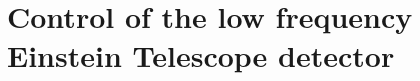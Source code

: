 \chapter{\label{c:et-lf-control}Control of the low frequency Einstein Telescope detector}

\newcommand{\AS}{AS}
\newcommand{\POP}{POP}
\newcommand{\REFL}{REFL}

\newcommand{\ASDC}{$\text{\AS}_{\text{DC}}$}
\newcommand{\ASFIRSTI}{$\text{\AS}_{\num{11}}^{\text{I}}$}
\newcommand{\ASFIRSTQ}{$\text{\AS}_{\num{11}}^{\text{Q}}$}
\newcommand{\ASSECONDI}{$\text{\AS}_{\num{57}}^{\text{I}}$}
\newcommand{\ASSECONDQ}{$\text{\AS}_{\num{57}}^{\text{Q}}$}
\newcommand{\ASSUMI}{$\text{\AS}_{\num{68}}^{\text{I}}$}
\newcommand{\ASSUMQ}{$\text{\AS}_{\num{68}}^{\text{Q}}$}
\newcommand{\ASDIFFI}{$\text{\AS}_{\num{45}}^{\text{I}}$}
\newcommand{\ASDIFFQ}{$\text{\AS}_{\num{45}}^{\text{Q}}$}
\newcommand{\POPDC}{$\text{\POP}_{\text{DC}}$}
\newcommand{\POPFIRSTI}{$\text{\POP}_{\num{11}}^{\text{I}}$}
\newcommand{\POPFIRSTQ}{$\text{\POP}_{\num{11}}^{\text{Q}}$}
\newcommand{\POPSECONDI}{$\text{\POP}_{\num{57}}^{\text{I}}$}
\newcommand{\POPSECONDQ}{$\text{\POP}_{\num{57}}^{\text{Q}}$}
\newcommand{\POPSUMI}{$\text{\POP}_{\num{68}}^{\text{I}}$}
\newcommand{\POPSUMQ}{$\text{\POP}_{\num{68}}^{\text{Q}}$}
\newcommand{\POPDIFFI}{$\text{\POP}_{\num{45}}^{\text{I}}$}
\newcommand{\POPDIFFQ}{$\text{\POP}_{\num{45}}^{\text{Q}}$}
\newcommand{\REFLDC}{$\text{\REFL}_{\text{DC}}$}
\newcommand{\REFLFIRSTI}{$\text{\REFL}_{\num{11}}^{\text{I}}$}
\newcommand{\REFLFIRSTQ}{$\text{\REFL}_{\num{11}}^{\text{Q}}$}
\newcommand{\REFLSECONDI}{$\text{\REFL}_{\num{57}}^{\text{I}}$}
\newcommand{\REFLSECONDQ}{$\text{\REFL}_{\num{57}}^{\text{Q}}$}
\newcommand{\REFLSUMI}{$\text{\REFL}_{\num{68}}^{\text{I}}$}
\newcommand{\REFLSUMQ}{$\text{\REFL}_{\num{68}}^{\text{Q}}$}
\newcommand{\REFLDIFFI}{$\text{\REFL}_{\num{45}}^{\text{I}}$}
\newcommand{\REFLDIFFQ}{$\text{\REFL}_{\num{45}}^{\text{Q}}$}

\newcommand{\ASFIRST}{$\text{\AS}_{\num{11}}$}
\newcommand{\ASSECOND}{$\text{\AS}_{\num{57}}$}
\newcommand{\ASSUM}{$\text{\AS}_{\num{68}}$}
\newcommand{\ASDIFF}{$\text{\AS}_{\num{45}}$}
\newcommand{\POPFIRST}{$\text{\POP}_{\num{11}}$}
\newcommand{\POPSECOND}{$\text{\POP}_{\num{57}}$}
\newcommand{\POPSUM}{$\text{\POP}_{\num{68}}$}
\newcommand{\POPDIFF}{$\text{\POP}_{\num{45}}$}
\newcommand{\REFLFIRST}{$\text{\REFL}_{\num{11}}$}
\newcommand{\REFLSECOND}{$\text{\REFL}_{\num{57}}$}
\newcommand{\REFLSUM}{$\text{\REFL}_{\num{68}}$}
\newcommand{\REFLDIFF}{$\text{\REFL}_{\num{45}}$}

